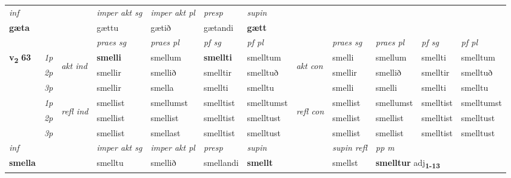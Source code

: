 \begin{longtable}[l]{X>{\footnotesize\itshape}llXXXXlXXXX}
   {\textit{inf}} & &  & \textit{imper akt sg} & \textit{imper akt pl}   & \textit{presp} & \textit{supin}   \\*
  {\textbf{gæta}} & && gættu  & gætið   & gætandi &  \textbf{gætt}   \\*

\midrule

 & &   & \textit{praes sg}  & \textit{praes pl}    & \textit{ pf sg} & \textit{pf pl} & & \textit{praes sg}  & \textit{praes pl}    & \textit{pf sg} & \textit{pf pl }  \\ \cmidrule{4-7} \cmidrule{9-12}
 \multirow{2}{*}{{{\textbf{v{\textsubscript{2}}} \Large{\textbf{63}}}}}  & 1p & \multirow{3}{*}{\begin{turn}{90}\textit{akt ind}\end{turn}} & \textbf{smelli} & smellum & \textbf{smellti} & smelltum & \multirow{3}{*}{\begin{turn}{90}\textit{akt con}\end{turn}} &smelli & smellum & smellti & smelltum\\*
 & 2p &  &  smellir  & smellið & smelltir & smelltuð & & smellir & smellið & smelltir & smelltuð \\*
 & 3p &  & smellir & smella & smellti & smelltu & & smelli & smelli& smellti & smelltu \\*
\cmidrule{4-7} \cmidrule{9-12}
 & 1p & \multirow{3}{*}{\begin{turn}{90}\textit{refl ind}\end{turn}}  & smellist & smellumst & smelltist & smelltumst & \multirow{3}{*}{\begin{turn}{90}\textit{refl con}\end{turn}}  &smellist & smellumst & smelltist & smelltumst \\*
 & 2p &  & smellist & smellist & smelltist & smelltust & &smellist & smellist & smelltist & smelltust \\*
 & 3p  & & smellist & smellast & smelltist & smelltust & & smellist & smellist& smelltist & smelltust \\*
\cmidrule{4-7} \cmidrule{9-12}

   {\textit{inf}} & &  & \textit{imper akt sg} & \textit{imper akt pl}   & \textit{presp} & \textit{supin} && \textit{supin refl} & \textit{pp m} \\*
  {\textbf{smella}} & && smelltu  & smellið   & smellandi &  \textbf{smellt} && smellst & \multicolumn{2}{l}{\textbf{smelltur} adj\textbf{\textsubscript{1-13}}} \\*


\end{longtable}
